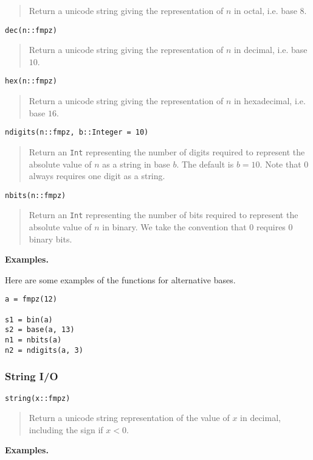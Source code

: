 \documentclass[a4paper,10pt]{article}
\newcommand{\code}{\lstinline}
\newcommand{\desc}[1]{\vspace{-3mm}\begin{quote}#1\end{quote}}
\begin{document}
{{\desc{Return a unicode string giving the representation of $n$ in octal, i.e. base $8$.}

\begin{lstlisting}
dec(n::fmpz)
\end{lstlisting}

\desc{Return a unicode string giving the representation of $n$ in decimal, i.e. base $10$.}

\begin{lstlisting}
hex(n::fmpz)
\end{lstlisting}

\desc{Return a unicode string giving the representation of $n$ in hexadecimal, i.e. base $16$.}

\begin{lstlisting}
ndigits(n::fmpz, b::Integer = 10)
\end{lstlisting}

\desc{Return an \code{Int} representing the number of digits required to represent the
absolute value of $n$ as a string in base $b$. The default is $b = 10$. Note that $0$
always requires one digit as a string.}

\begin{lstlisting}
nbits(n::fmpz)
\end{lstlisting}

\desc{Return an \code{Int} representing the number of bits required to represent the
absolute value of $n$ in binary. We take the convention that $0$ requires $0$ binary 
bits.}

\textbf{Examples.}

Here are some examples of the functions for alternative bases.

\begin{lstlisting}
a = fmpz(12)

s1 = bin(a)
s2 = base(a, 13)
n1 = nbits(a)
n2 = ndigits(a, 3)
\end{lstlisting}

\subsubsection{String I/O}

\begin{lstlisting}
string(x::fmpz)
\end{lstlisting}

\desc{Return a unicode string representation of the value of $x$ in decimal, including the sign
if $x < 0$.}

\textbf{Examples.}

}}
\end{document}
